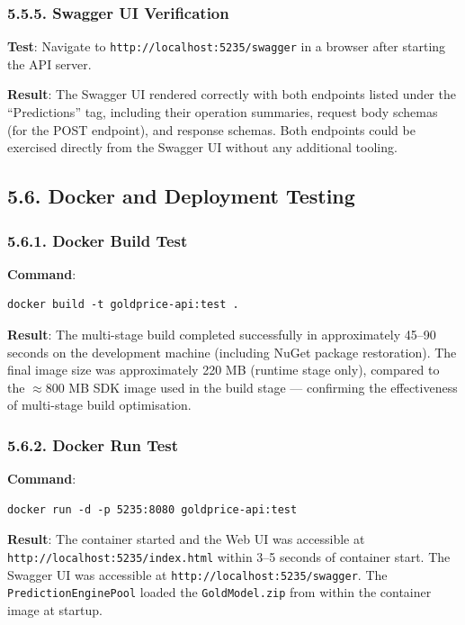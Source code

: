 \subsubsection{5.5.5. Swagger UI Verification}
\textbf{Test}: Navigate to \texttt{http://localhost:5235/swagger} in a browser after starting the API server.

\textbf{Result}: The Swagger UI rendered correctly with both endpoints listed under the ``Predictions'' tag, including their operation summaries, request body schemas (for the POST endpoint), and response schemas. Both endpoints could be exercised directly from the Swagger UI without any additional tooling.

\subsection{5.6. Docker and Deployment Testing}

\subsubsection{5.6.1. Docker Build Test}
\textbf{Command}:
\begin{lstlisting}[language={}, numbers=none]
docker build -t goldprice-api:test .
\end{lstlisting}

\textbf{Result}: The multi-stage build completed successfully in approximately 45--90 seconds on the development machine (including NuGet package restoration). The final image size was approximately 220 MB (runtime stage only), compared to the $\approx$800 MB SDK image used in the build stage --- confirming the effectiveness of multi-stage build optimisation.

\subsubsection{5.6.2. Docker Run Test}
\textbf{Command}:
\begin{lstlisting}[language={}, numbers=none]
docker run -d -p 5235:8080 goldprice-api:test
\end{lstlisting}

\textbf{Result}: The container started and the Web UI was accessible at \texttt{http://localhost:5235/index.html} within 3--5 seconds of container start. The Swagger UI was accessible at \texttt{http://localhost:5235/swagger}. The \texttt{PredictionEnginePool} loaded the \texttt{GoldModel.zip} from within the container image at startup.

